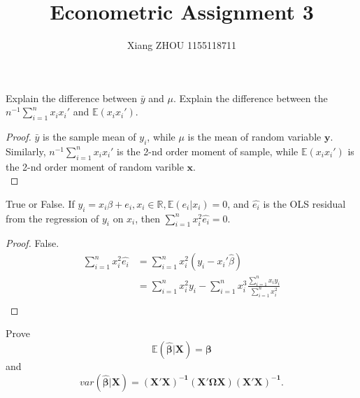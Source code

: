 \documentclass[12pt]{article}
\newenvironment{question}[2][Question]{\begin{trivlist}
\item[\hskip \labelsep {\bfseries #1}\hskip \labelsep {\bfseries #2.}]}{\end{trivlist}}
\begin{document}
 
\title{Econometric Assignment 3}
\author{Xiang ZHOU 1155118711}
\maketitle
 
\begin{question}{4.3}
Explain the difference between $\bar{y}$  and $\mu$. Explain the difference between the $n^{-1}\sum_{i=1}^{n}x_i x_i'$ and $\mathbb{E}(x_i x_i')$.
\end{question}

\begin{proof}
$\bar{y}$ is the sample mean of $y_i$, while $\mu$ is the mean of random variable $\bm{y}$.\\
Similarly, $n^{-1}\sum_{i=1}^{n}x_i x_i'$ is the 2-nd order moment of sample, while $\mathbb{E}(x_i x_i')$ is the 2-nd order moment of random varible $\bm{x}$.\\
\end{proof}

\begin{question}{4.4}
True or False. If $y_i = x_i \beta+e_i, x_i\in \mathbb{R}, \mathbb{E}(e_i|x_i) = 0$, and $\hat{e_i}$ is the OLS residual from the regression of $y_i$ on $x_i$, then $\sum_{i=1}^{n}x_i^2 \hat{e_i} = 0$.
\end{question}

\begin{proof}
False.\\
\begin{align*}
\sum_{i=1}^{n}x_i^2 \hat{e_i} 
&= \sum_{i=1}^{n}x_i^2 (y_i - x_i'\hat{\beta})\\
&= \sum_{i=1}^{n}x_i^2y_i -\sum_{i=1}^{n}x_i^3\frac{\sum_{i = 1}^n x_iy_i}{\sum_{i = 1}^nx_i^2}\\
\end{align*}
\end{proof}

\begin{question}{4.5}
Prove $$\mathbb{E}(\bm{\hat{\beta}}|\bm{X})=\bm{\beta}$$ and $$var(\bm{\hat{\beta}}|\bm{X}) = \bm{(X'X)^{-1}(X'\Omega X)(X'X)^{-1}}.$$
\end{question}
\end{document}
